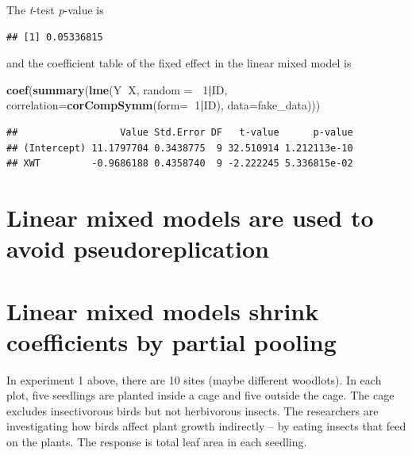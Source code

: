 \documentclass[]{book}
\newenvironment{Shaded}{\begin{snugshade}}{\end{snugshade}}
\newcommand{\KeywordTok}[1]{\textcolor[rgb]{0.13,0.29,0.53}{\textbf{#1}}}
\newcommand{\DataTypeTok}[1]{\textcolor[rgb]{0.13,0.29,0.53}{#1}}
\newcommand{\DecValTok}[1]{\textcolor[rgb]{0.00,0.00,0.81}{#1}}
\newcommand{\OtherTok}[1]{\textcolor[rgb]{0.56,0.35,0.01}{#1}}
\newcommand{\OperatorTok}[1]{\textcolor[rgb]{0.81,0.36,0.00}{\textbf{#1}}}
\newcommand{\NormalTok}[1]{#1}
\begin{document}
The \emph{t}-test \emph{p}-value is

\begin{Shaded}
\end{Shaded}

\begin{verbatim}
## [1] 0.05336815
\end{verbatim}

and the coefficient table of the fixed effect in the linear mixed model
is

\begin{Shaded}
\begin{Highlighting}[]
\KeywordTok{coef}\NormalTok{(}\KeywordTok{summary}\NormalTok{(}\KeywordTok{lme}\NormalTok{(Y}\OperatorTok{~}\NormalTok{X, }\DataTypeTok{random =} \OperatorTok{~}\DecValTok{1}\OperatorTok{|}\NormalTok{ID, }\DataTypeTok{correlation=}\KeywordTok{corCompSymm}\NormalTok{(}\DataTypeTok{form=}\OperatorTok{~}\DecValTok{1}\OperatorTok{|}\NormalTok{ID), }\DataTypeTok{data=}\NormalTok{fake_data)))}
\end{Highlighting}
\end{Shaded}

\begin{verbatim}
##                  Value Std.Error DF   t-value      p-value
## (Intercept) 11.1797704 0.3438775  9 32.510914 1.212113e-10
## XWT         -0.9686188 0.4358740  9 -2.222245 5.336815e-02
\end{verbatim}

\section{Linear mixed models are used to avoid
pseudoreplication}\label{linear-mixed-models-are-used-to-avoid-pseudoreplication}

\section{Linear mixed models shrink coefficients by partial
pooling}\label{linear-mixed-models-shrink-coefficients-by-partial-pooling}

In experiment 1 above, there are 10 sites (maybe different woodlots). In
each plot, five seedlings are planted inside a cage and five outside the
cage. The cage excludes insectivorous birds but not herbivorous insects.
The researchers are investigating how birds affect plant growth
indirectly -- by eating insects that feed on the plants. The response is
total leaf area in each seedling.
\end{document}
